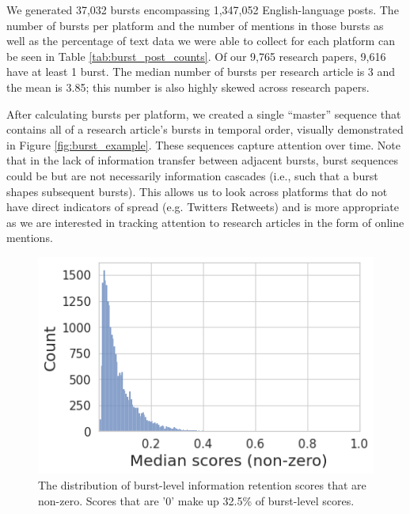 \documentclass[letterpaper]{article} %
\begin{document}

We generated 37,032 bursts encompassing 1,347,052 English-language posts. The number of bursts per platform and the number of mentions in those bursts as well as the percentage of text data we were able to collect for each platform can be seen in Table \ref{tab:burst_post_counts}.
Of our 9,765 research papers, 9,616 have at least 1 burst. The median number of bursts per research article is 3 and the mean is 3.85; this number is also highly skewed across research papers.%

After calculating bursts per platform, we created a single ``master'' sequence that contains all of a research article's bursts in temporal order, visually demonstrated in Figure \ref{fig:burst_example}. These sequences capture attention over time. Note that in the lack of information transfer between adjacent bursts, burst sequences could be but are not necessarily information cascades (i.e., such that a burst shapes subsequent bursts). This allows us to look across platforms that do not have direct indicators of spread (e.g. Twitters Retweets) and is more appropriate as we are interested in tracking attention to research articles in the form of online mentions.

\begin{figure}[t]
    \centering
    \includegraphics[width=0.85\columnwidth]{figs/fig2.png}
    \caption{The distribution of burst-level information retention scores that are non-zero. Scores that are '0' make up 32.5\% of burst-level scores.}
    \label{fig:score_distribution}
\end{figure}
\end{document}
